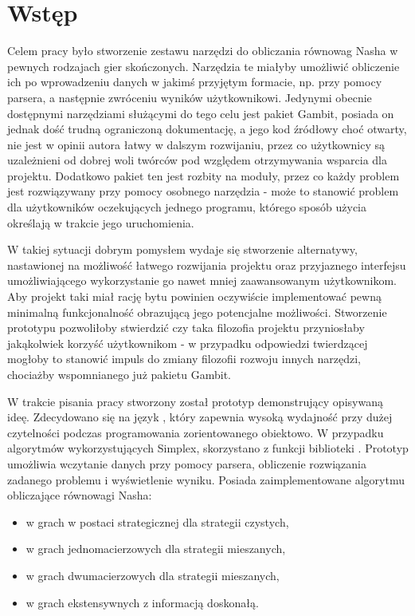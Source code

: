 \documentclass[polish]{standalone}
\begin{document}
\pagestyle{headings}

\section*{Wstęp}

Celem pracy było stworzenie zestawu narzędzi do obliczania równowag Nasha w pewnych rodzajach gier skończonych.
Narzędzia te miałyby umożliwić obliczenie ich po wprowadzeniu danych w jakimś przyjętym formacie, np. przy pomocy 
parsera, a następnie zwróceniu wyników użytkownikowi. Jedynymi obecnie dostępnymi narzędziami służącymi do tego celu
jest pakiet Gambit, posiada on jednak dość trudną ograniczoną dokumentację, a jego kod źródłowy choć otwarty, nie jest
w opinii autora łatwy w dalszym rozwijaniu, przez co użytkownicy są uzależnieni od dobrej woli twórców pod względem
otrzymywania wsparcia dla projektu. Dodatkowo pakiet ten jest rozbity na moduły, przez co każdy problem jest
rozwiązywany przy pomocy osobnego narzędzia - może to stanowić problem dla użytkowników oczekujących jednego programu,
którego sposób użycia określają w trakcie jego uruchomienia.

W takiej sytuacji dobrym pomysłem wydaje się stworzenie alternatywy, nastawionej na możliwość łatwego rozwijania
projektu oraz przyjaznego interfejsu umożliwiającego wykorzystanie go nawet mniej zaawansowanym użytkownikom. Aby
projekt taki miał rację bytu powinien oczywiście implementować pewną minimalną funkcjonalność obrazującą jego
potencjalne możliwości. Stworzenie prototypu pozwoliłoby stwierdzić czy taka filozofia projektu przyniosłaby jakąkolwiek
korzyść użytkownikom - w przypadku odpowiedzi twierdzącej mogłoby to stanowić impuls do zmiany filozofii rozwoju innych
narzędzi, chociażby wspomnianego już pakietu Gambit.

W trakcie pisania pracy stworzony został prototyp demonstrujący opisywaną ideę. Zdecydowano się na język ,
który zapewnia wysoką wydajność przy dużej czytelności podczas programowania zorientowanego obiektowo. W przypadku
algorytmów wykorzystujących Simplex, skorzystano z funkcji biblioteki . Prototyp umożliwia wczytanie danych
przy pomocy parsera, obliczenie rozwiązania zadanego problemu i wyświetlenie wyniku. Posiada zaimplementowane algorytmu
obliczające równowagi Nasha:
\begin{itemize}
\item w grach w postaci strategicznej dla strategii czystych,
\item w grach jednomacierzowych dla strategii mieszanych,
\item w grach dwumacierzowych dla strategii mieszanych,
\item w grach ekstensywnych z informacją doskonałą.
\end{itemize}
\end{document}

